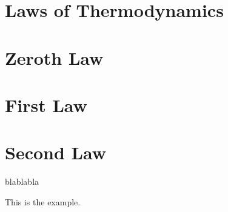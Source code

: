 \section{Laws of Thermodynamics}\label{Chapter:Introduction:Section:LawsThermodynamics}

\section{Zeroth Law}\label{zeroth_law}



\section{First Law}\label{first_law}


\section{Second Law}\label{second_law}





blablabla \cite{batchelor_1967} \cite{SmithVanNess_Book}

\begin{exmp}
This is the example.
\end{exmp}
%
